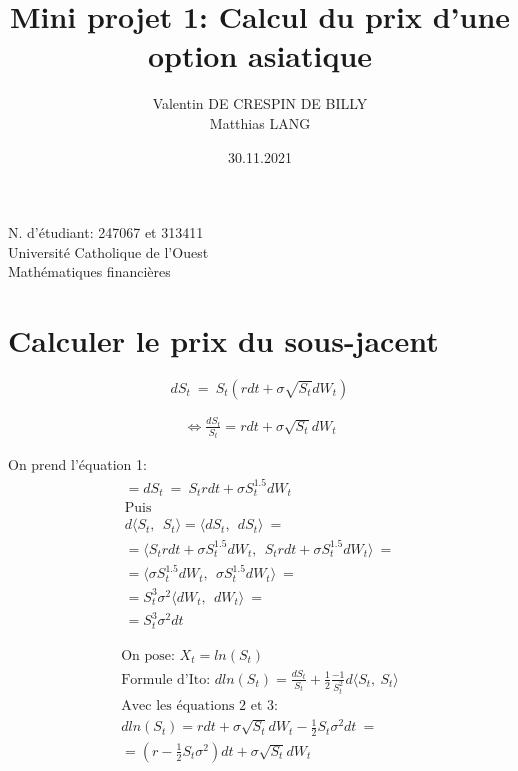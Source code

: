 \documentclass[a4paper,12pt]{scrartcl}
\title{Mini projet 1: Calcul du prix d'une option asiatique}
\author{Valentin DE CRESPIN DE BILLY \\ Matthias LANG}
\date{30.11.2021}
\begin{document}
\maketitle
\begin{center}

  \thispagestyle{empty}

  N. d'étudiant: 247067 et 313411\\
  Université Catholique de l'Ouest\\
  Mathématiques financières

\end{center}

\newpage

\section{Calculer le prix du sous-jacent}

\begin{equation} \label{1} 
dS_t~=~S_t(rdt+\sigma \sqrt{S_t} dW_t) 
\end{equation}

\begin{equation} \label{2}
\begin{multlined}
     \iff \frac{dS_t}{S_t} = rdt+\sigma \sqrt{S_t} dW_t
\end{multlined}
\end{equation}


On prend l'équation 1:
\begin{equation} \label{3}
\begin{multlined}
= dS_t~=~S_trdt+\sigma S_t^{1.5} dW_t \\
\text{Puis} \\
d \langle S_t,~~ S_t\rangle 
=\langle dS_t,~~ dS_t\rangle ~=\\
=\langle S_trdt+\sigma S_t^{1.5} dW_t,~~
         S_trdt+\sigma S_t^{1.5} dW_t \rangle ~=\\
=\langle \sigma S_t^{1.5} dW_t,~~
         \sigma S_t^{1.5} dW_t \rangle ~=\\
=S_t^3 \sigma^2 \langle dW_t,~~ dW_t \rangle ~=\\
=S_t^3 \sigma^2 dt
\end{multlined}
\end{equation}



\begin{equation} \label{4}
\begin{multlined}
\text{On pose: } X_t = ln(S_t) \\
\text{Formule d'Ito: } dln(S_t) = \frac{dS_t}{S_t} + \frac{1}{2} \frac{-1}{S_t^2}d \langle S_t, ~S_t \rangle \\
\text{Avec les équations 2 et 3:} \\
dln(S_t) = rdt + \sigma \sqrt{S_t} dW_t - \frac{1}{2}S_t \sigma^2 dt ~= \\
= (r - \frac{1}{2}S_t\sigma^2)dt + \sigma\sqrt{S_t}dW_t
\end{multlined}
\end{equation}
\end{document}
